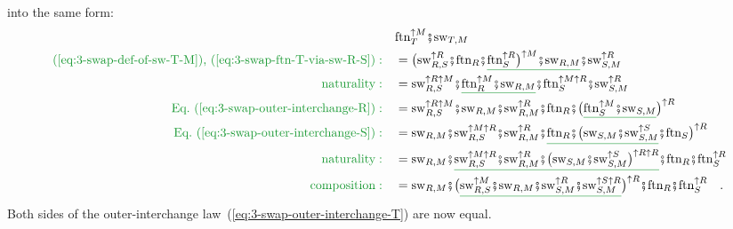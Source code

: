 into the same form:
\begin{align*}
 & \text{ftn}_{T}^{\uparrow M}\bef\text{sw}_{T,M}\\
{\color{greenunder}\text{(\ref{eq:3-swap-def-of-sw-T-M}), (\ref{eq:3-swap-ftn-T-via-sw-R-S})}:}\quad & =\big(\text{sw}_{R,S}^{\uparrow R}\bef\text{ftn}_{R}\bef\gunderline{\text{ftn}_{S}^{\uparrow R}\big)^{\uparrow M}\bef\text{sw}_{R,M}}\bef\text{sw}_{S,M}^{\uparrow R}\\
{\color{greenunder}\text{naturality}:}\quad & =\text{sw}_{R,S}^{\uparrow R\uparrow M}\bef\gunderline{\text{ftn}_{R}^{\uparrow M}\bef\text{sw}_{R,M}}\bef\text{ftn}_{S}^{\uparrow M\uparrow R}\bef\text{sw}_{S,M}^{\uparrow R}\\
{\color{greenunder}\text{Eq.~(\ref{eq:3-swap-outer-interchange-R})}:}\quad & =\text{sw}_{R,S}^{\uparrow R\uparrow M}\bef\text{sw}_{R,M}\bef\text{sw}_{R,M}^{\uparrow R}\bef\text{ftn}_{R}\bef\big(\gunderline{\text{ftn}_{S}^{\uparrow M}\bef\text{sw}_{S,M}}\big)^{\uparrow R}\\
{\color{greenunder}\text{Eq.~(\ref{eq:3-swap-outer-interchange-S})}:}\quad & =\text{sw}_{R,M}\bef\text{sw}_{R,S}^{\uparrow M\uparrow R}\bef\text{sw}_{R,M}^{\uparrow R}\bef\gunderline{\text{ftn}_{R}\bef\big(\text{sw}_{S,M}\bef\text{sw}_{S,M}^{\uparrow S}}\bef\text{ftn}_{S}\big)^{\uparrow R}\\
{\color{greenunder}\text{naturality}:}\quad & =\text{sw}_{R,M}\bef\gunderline{\text{sw}_{R,S}^{\uparrow M\uparrow R}\bef\text{sw}_{R,M}^{\uparrow R}\bef\big(\text{sw}_{S,M}\bef\text{sw}_{S,M}^{\uparrow S}\big)^{\uparrow R\uparrow R}}\bef\text{ftn}_{R}\bef\text{ftn}_{S}^{\uparrow R}\\
{\color{greenunder}\text{composition}:}\quad & =\text{sw}_{R,M}\bef\big(\gunderline{\text{sw}_{R,S}^{\uparrow M}\bef\text{sw}_{R,M}\bef\text{sw}_{S,M}^{\uparrow R}\bef\text{sw}_{S,M}^{\uparrow S\uparrow R}}\big)^{\uparrow R}\bef\text{ftn}_{R}\bef\text{ftn}_{S}^{\uparrow R}\quad.
\end{align*}
Both sides of the outer-interchange law~(\ref{eq:3-swap-outer-interchange-T})
are now equal.


